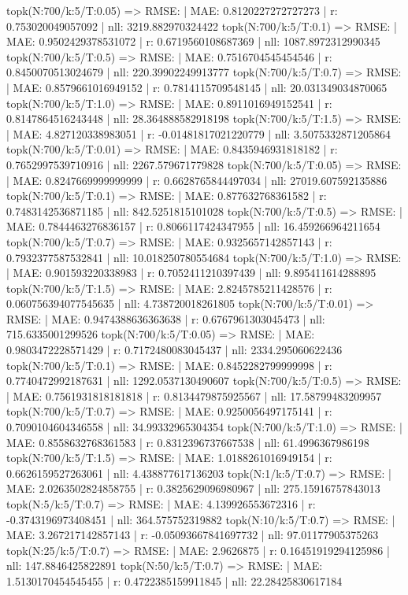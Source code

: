 topk(N:700/k:5/T:0.05) => RMSE: | MAE: 0.8120227272727273 | r: 0.753020049057092 | nll: 3219.882970324422
topk(N:700/k:5/T:0.1) => RMSE: | MAE: 0.9502429378531072 | r: 0.6719560108687369 | nll: 1087.8972312990345
topk(N:700/k:5/T:0.5) => RMSE: | MAE: 0.7516704545454546 | r: 0.8450070513024679 | nll: 220.39902249913777
topk(N:700/k:5/T:0.7) => RMSE: | MAE: 0.8579661016949152 | r: 0.7814115709548145 | nll: 20.031349034870065
topk(N:700/k:5/T:1.0) => RMSE: | MAE: 0.8911016949152541 | r: 0.8147864516243448 | nll: 28.364888582918198
topk(N:700/k:5/T:1.5) => RMSE: | MAE: 4.827120338983051 | r: -0.01481817021220779 | nll: 3.5075332871205864
topk(N:700/k:5/T:0.01) => RMSE: | MAE: 0.8435946931818182 | r: 0.7652997539710916 | nll: 2267.579671779828
topk(N:700/k:5/T:0.05) => RMSE: | MAE: 0.8247669999999999 | r: 0.6628765844497034 | nll: 27019.607592135886
topk(N:700/k:5/T:0.1) => RMSE: | MAE: 0.877632768361582 | r: 0.7483142536871185 | nll: 842.5251815101028
topk(N:700/k:5/T:0.5) => RMSE: | MAE: 0.7844463276836157 | r: 0.8066117424347955 | nll: 16.459266964211654
topk(N:700/k:5/T:0.7) => RMSE: | MAE: 0.9325657142857143 | r: 0.7932377587532841 | nll: 10.018250780554684
topk(N:700/k:5/T:1.0) => RMSE: | MAE: 0.901593220338983 | r: 0.7052411210397439 | nll: 9.895411614288895
topk(N:700/k:5/T:1.5) => RMSE: | MAE: 2.8245785211428576 | r: 0.060756394077545635 | nll: 4.738720018261805
topk(N:700/k:5/T:0.01) => RMSE: | MAE: 0.9474388636363638 | r: 0.6767961303045473 | nll: 715.6335001299526
topk(N:700/k:5/T:0.05) => RMSE: | MAE: 0.9803472228571429 | r: 0.7172480083045437 | nll: 2334.295060622436
topk(N:700/k:5/T:0.1) => RMSE: | MAE: 0.8452282799999998 | r: 0.7740472992187631 | nll: 1292.0537130490607
topk(N:700/k:5/T:0.5) => RMSE: | MAE: 0.7561931818181818 | r: 0.8134479875925567 | nll: 17.58799483209957
topk(N:700/k:5/T:0.7) => RMSE: | MAE: 0.9250056497175141 | r: 0.7090104604346558 | nll: 34.99332965304354
topk(N:700/k:5/T:1.0) => RMSE: | MAE: 0.8558632768361583 | r: 0.8312396737667538 | nll: 61.4996367986198
topk(N:700/k:5/T:1.5) => RMSE: | MAE: 1.0188261016949154 | r: 0.6626159527263061 | nll: 4.438877617136203
topk(N:1/k:5/T:0.7) => RMSE: | MAE: 2.0263502824858755 | r: 0.3825629096980967 | nll: 275.15916757843013
topk(N:5/k:5/T:0.7) => RMSE: | MAE: 4.139926553672316 | r: -0.3743196973408451 | nll: 364.575752319882
topk(N:10/k:5/T:0.7) => RMSE: | MAE: 3.267217142857143 | r: -0.05093667841697732 | nll: 97.01177905375263
topk(N:25/k:5/T:0.7) => RMSE: | MAE: 2.9626875 | r: 0.16451919294125986 | nll: 147.8846425822891
topk(N:50/k:5/T:0.7) => RMSE: | MAE: 1.5130170454545455 | r: 0.4722385159911845 | nll: 22.28425830617184
